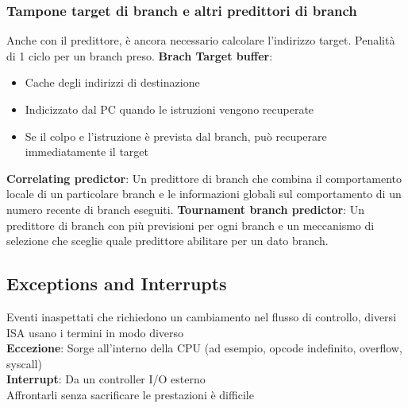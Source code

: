 \documentclass[12pt,a4paper]{article}
\begin{document}
\subsubsection{Tampone target di branch e altri predittori di branch}
Anche con il predittore, è ancora necessario calcolare l'indirizzo target. Penalità di 1 ciclo per un branch preso.
\textbf{Brach Target buffer}:
\begin{itemize}
\item Cache degli indirizzi di destinazione
\item Indicizzato dal PC quando le istruzioni vengono recuperate
\item Se il colpo e l'istruzione è prevista dal branch, può recuperare immediatamente il target
\end{itemize}
\textbf{Correlating predictor}: Un predittore di branch che combina il comportamento locale di un particolare branch e le informazioni globali sul comportamento di un numero recente di branch eseguiti.
\textbf{Tournament branch predictor}: Un predittore di branch con più previsioni per ogni branch e un meccanismo di selezione che sceglie quale predittore abilitare per un dato branch.

\subsection{Exceptions and Interrupts}
Eventi inaspettati che richiedono un cambiamento nel flusso di controllo, diversi ISA usano i termini in modo diverso\\
\textbf{Eccezione}: Sorge all'interno della CPU (ad esempio, opcode indefinito, overflow, syscall)\\
\textbf{Interrupt}: Da un controller I/O esterno\\
Affrontarli senza sacrificare le prestazioni è difficile
\begin{center}
\end{center}
\end{document}
